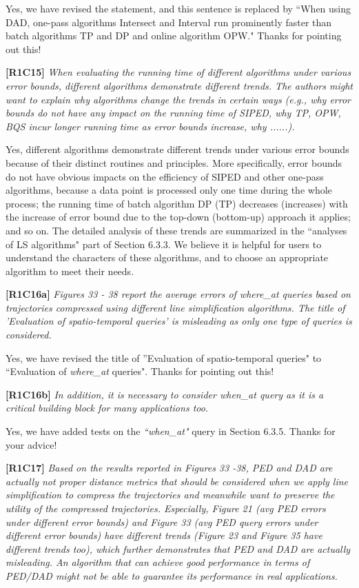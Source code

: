 \documentclass{letter}
\begin{document}
{Yes, we have revised the statement, and this sentence is replaced by ``When using DAD, one-pass algorithms Intersect and Interval run prominently faster than batch algorithms TP and DP and online algorithm OPW." 
Thanks for pointing out this!

\textbf{[R1C15]} \emph{ When evaluating the running time of different algorithms under various error bounds, different algorithms demonstrate different trends. The authors might want to explain why algorithms change the trends in certain ways (e.g., why error bounds do not have any impact on the running time of SIPED, why TP, OPW, BQS incur longer running time as error bounds increase, why ......).}

Yes, different algorithms demonstrate different trends under various error bounds because of their distinct routines and principles. More specifically, error bounds do not have obvious impacts on the efficiency of SIPED and other one-pass algorithms, because a data point is processed only one time during the whole process; the running time of batch algorithm DP (TP) decreases (increases) with the increase of error bound due to the top-down (bottom-up) approach it applies; and so on. The detailed analysis of these trends are summarized in the ``analyses of LS algorithms" part of Section 6.3.3. 
%
We believe it is helpful for users to understand the characters of these algorithms, and to choose an appropriate algorithm to meet their needs.

\textbf{[R1C16a]} \emph{ Figures 33 - 38 report the average errors of where\_at queries based on trajectories compressed using different line simplification algorithms. The title of 'Evaluation of spatio-temporal queries' is misleading as only one type of queries is considered.} 

Yes, we have revised the title of ''Evaluation of spatio-temporal queries" to ``Evaluation of \emph{where\_at} queries". Thanks for pointing out this!

\textbf{[R1C16b]} \emph{In addition, it is necessary to consider \emph{when\_at} query as it is a critical building block for many applications too.} 

Yes, we have added tests on the \emph{``when\_at"} query in Section 6.3.5. Thanks for your advice!

\textbf{[R1C17]} \emph{ Based on the results reported in Figures 33 -38, PED and DAD are actually not proper distance metrics that should be considered when we apply line simplification to compress the trajectories and meanwhile want to preserve the utility of the compressed trajectories. Especially, Figure 21 (avg PED errors under different error bounds) and Figure 33 (avg PED query errors under different error bounds) have different trends (Figure 23 and Figure 35 have different trends too), which further demonstrates that PED and DAD are actually misleading. An algorithm that can achieve good performance in terms of PED/DAD might not be able to guarantee its performance in real applications. }

}
\end{document}
